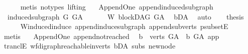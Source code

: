\begin{isabellebody}
\ \ \ \ \isamarkupfalse%
\ {\isacharparenleft}{\kern0pt}metis\ {\isacharparenleft}{\kern0pt}no{\isacharunderscore}{\kern0pt}types{\isacharcomma}{\kern0pt}\ lifting{\isacharparenright}{\kern0pt}{\isacharparenright}{\kern0pt}\ \isanewline
{}\isamarkupfalse%
%
\endisatagproof
{\isafoldproof}%
%
\isadelimproof
\isanewline
%
\endisadelimproof
\isanewline
{}\isamarkupfalse%
\ {\isacharparenleft}{\kern0pt}\ Append{\isacharunderscore}{\kern0pt}One{\isacharparenright}{\kern0pt}\ append{\isacharunderscore}{\kern0pt}induced{\isacharunderscore}{\kern0pt}subgraph{\isacharcolon}{\kern0pt}\ \isanewline
\ \ {\isachardoublequoteopen}induced{\isacharunderscore}{\kern0pt}subgraph\ G\ G{\isacharunderscore}{\kern0pt}A\ {\isachardoublequoteclose}\isanewline
%
\isadelimproof
%
\endisadelimproof
%
\isatagproof
{}\isamarkupfalse%
\ {\isacharminus}{\kern0pt}\isanewline
\ \ \isamarkupfalse%
\ W{\isacharcolon}{\kern0pt}\ blockDAG\ {\isachardoublequoteopen}G{\isacharunderscore}{\kern0pt}A{\isachardoublequoteclose}\ \isamarkupfalse%
\ bD{\isacharunderscore}{\kern0pt}A\ \isamarkupfalse%
\ auto\isanewline
\ \ \isamarkupfalse%
\ {\isacharquery}{\kern0pt}thesis\isanewline
\ \ \ \ \isamarkupfalse%
\ W{\isachardot}{\kern0pt}induced{\isacharunderscore}{\kern0pt}induce\ append{\isacharunderscore}{\kern0pt}induce{\isacharunderscore}{\kern0pt}subgraph\ append{\isacharunderscore}{\kern0pt}subverts\ psubsetE\isanewline
\ \ \ \ \isamarkupfalse%
\ {\isacharparenleft}{\kern0pt}metis{\isacharparenright}{\kern0pt}\ \isanewline
{}\isamarkupfalse%
%
\endisatagproof
{\isafoldproof}%
%
\isadelimproof
\isanewline
%
\endisadelimproof
\isanewline
\isanewline
{}\isamarkupfalse%
\ {\isacharparenleft}{\kern0pt}\ Append{\isacharunderscore}{\kern0pt}One{\isacharparenright}{\kern0pt}\ append{\isacharunderscore}{\kern0pt}not{\isacharunderscore}{\kern0pt}reached{\isacharcolon}{\kern0pt}\isanewline
\ \ {\isachardoublequoteopen}{\isasymforall}b\ {\isasymin}\ verts\ G{\isacharunderscore}{\kern0pt}A{\isachardot}{\kern0pt}\ {\isasymnot}\ b\ {\isasymrightarrow}\isactrlsup {\isacharplus}{\kern0pt}\isactrlbsub G{\isacharunderscore}{\kern0pt}A\isactrlesub \ app{\isachardoublequoteclose}\isanewline
%
\isadelimproof
\ \ %
\endisadelimproof
%
\isatagproof
{}\isamarkupfalse%
\ tranclE\ wf{\isacharunderscore}{\kern0pt}digraph{\isachardot}{\kern0pt}reachable{}{\isacharunderscore}{\kern0pt}in{\isacharunderscore}{\kern0pt}verts{\isacharparenleft}{\kern0pt}{}{\isacharparenright}{\kern0pt}\ bD{\isacharunderscore}{\kern0pt}A\ subs\ new{\isacharunderscore}{\kern0pt}node\isanewline

\end{isabellebody}
